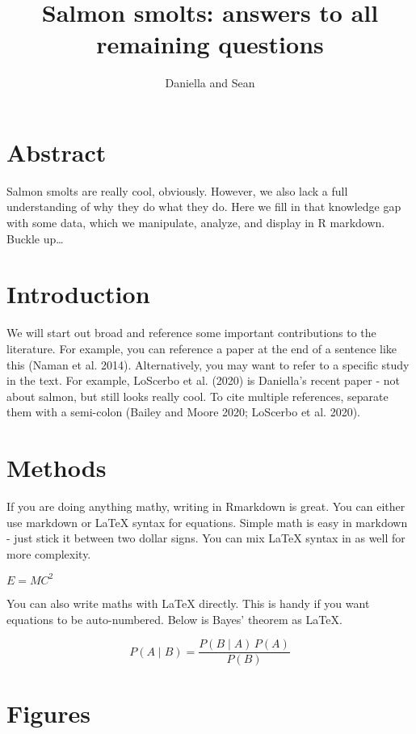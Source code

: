 \documentclass[]{article}
\title{Salmon smolts: answers to all remaining questions}
\author{Daniella and Sean}
\date{}
\begin{document}
\maketitle

\section{Abstract}\label{abstract}

Salmon smolts are really cool, obviously. However, we also lack a full
understanding of why they do what they do. Here we fill in that
knowledge gap with some data, which we manipulate, analyze, and display
in R markdown. Buckle up\ldots{}

\section{Introduction}\label{introduction}

We will start out broad and reference some important contributions to
the literature. For example, you can reference a paper at the end of a
sentence like this (Naman et al. 2014). Alternatively, you may want to
refer to a specific study in the text. For example, LoScerbo et al.
(2020) is Daniella's recent paper - not about salmon, but still looks
really cool. To cite multiple references, separate them with a
semi-colon (Bailey and Moore 2020; LoScerbo et al. 2020).

\section{Methods}\label{methods}

If you are doing anything mathy, writing in Rmarkdown is great. You can
either use markdown or LaTeX syntax for equations. Simple math is easy
in markdown - just stick it between two dollar signs. You can mix LaTeX
syntax in as well for more complexity.

\(E = MC^2\)

You can also write maths with LaTeX directly. This is handy if you want
equations to be auto-numbered. Below is Bayes' theorem as LaTeX.

\begin{equation}
P(A \mid B) = \frac{P(B \mid A) \, P(A)}{P(B)}
\end{equation}

\section{Figures}\label{figures}
\end{document}
